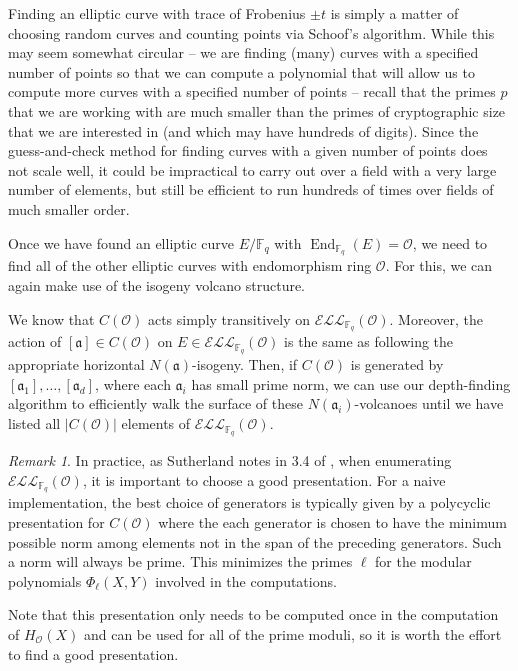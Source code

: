 \documentclass{amsart}
\theoremstyle{definition}
\theoremstyle{remark}
\newtheorem{remark}[thm]{Remark}
\numberwithin{equation}{section}
\newcommand{\cE}{\mathcal E}
\newcommand{\cL}{\mathcal L}
\newcommand{\cO}{\mathcal O}
\newcommand{\fka}{\mathfrak a}
\newcommand{\bbF}{\mathbb F}
\newcommand{\ELL}{\cE\cL\cL}
\DeclareMathOperator{\End}{End}
\begin{document}
 Finding an elliptic curve with trace of Frobenius $\pm t$ is simply a matter of choosing random curves and counting points via Schoof's algorithm. While this may seem somewhat circular -- we are finding (many) curves with a specified number of points so that we can compute a polynomial that will allow us to compute more curves with a specified number of points -- recall that the primes $p$ that we are working with are much smaller than the primes of cryptographic size that we are interested in (and which may have hundreds of digits). Since the guess-and-check method for finding curves with a given number of points does not scale well, it could be impractical to carry out over a field with a very large number of elements, but still be efficient to run hundreds of times over fields of much smaller order.
 
 Once we have found an elliptic curve $E/\bbF_{q}$ with $\End_{\bbF_{q}}(E) = \cO$, we need to find all of the other elliptic curves with endomorphism ring $\cO$. For this, we can again make use of the isogeny volcano structure. 
 
 We know that $C(\cO)$ acts simply transitively on $\ELL_{\bbF_{q}}(\cO)$. Moreover, the action of $[\fka] \in C(\cO)$ on $E \in \ELL_{\bbF_{q}}(\cO)$ is the same as following the appropriate horizontal $N(\fka)$-isogeny. Then, if $C(\cO)$ is generated by $[\fka_1],\dots, [\fka_{d}]$, where each $\fka_{i}$ has small prime norm, we can use our depth-finding algorithm to efficiently walk the surface of these $N(\fka_{i})$-volcanoes until we have listed all $|C(\cO)|$ elements of $\ELL_{\bbF_{q}}(\cO)$.

\begin{remark}
In practice, as Sutherland notes in 3.4 of \cite{SutherlandIV}, when enumerating $\ELL_{\bbF_{q}}(\cO)$, it is important to choose a good presentation. For a naive implementation, the best choice of generators is typically given by a polycyclic presentation for $C(\cO)$ where the each generator is chosen to have the minimum possible norm among elements not in the span of the preceding generators. Such a norm will always be prime. This minimizes the primes $\ell$ for the modular polynomials $\Phi_{\ell}(X,Y)$ involved in the computations.

Note that this presentation only needs to be computed once in the computation of $H_{\cO}(X)$ and can be used for all of the prime moduli, so it is worth the effort to find a good presentation.
\end{remark}
\end{document}
